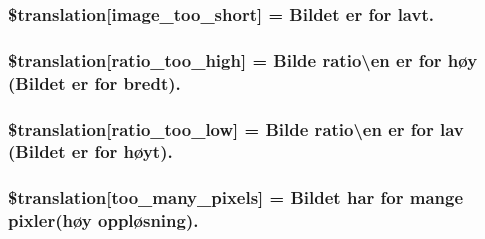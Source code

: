 \subsubsection[{\$translation}]{\setlength{\rightskip}{0pt plus 5cm}\$translation\mbox{[}\textquotesingle{}image\+\_\+too\+\_\+short\textquotesingle{}\mbox{]} = \textquotesingle{}Bildet er for lavt.\textquotesingle{}}\label{class_8upload_8no___n_o_8php_a86fcd4e1157b00032df451188d735527}
\hypertarget{class_8upload_8no___n_o_8php_a23396f6ce7f31e5e5f1b57580621d982}{}
\subsubsection[{\$translation}]{\setlength{\rightskip}{0pt plus 5cm}\$translation\mbox{[}\textquotesingle{}ratio\+\_\+too\+\_\+high\textquotesingle{}\mbox{]} = \textquotesingle{}Bilde ratio\textbackslash{}\textquotesingle{}en er for høy (Bildet er for bredt).\textquotesingle{}}\label{class_8upload_8no___n_o_8php_a23396f6ce7f31e5e5f1b57580621d982}
\hypertarget{class_8upload_8no___n_o_8php_ac533b9a479f056b0b8623e4268f068c2}{}
\subsubsection[{\$translation}]{\setlength{\rightskip}{0pt plus 5cm}\$translation\mbox{[}\textquotesingle{}ratio\+\_\+too\+\_\+low\textquotesingle{}\mbox{]} = \textquotesingle{}Bilde ratio\textbackslash{}\textquotesingle{}en er for lav (Bildet er for høyt).\textquotesingle{}}\label{class_8upload_8no___n_o_8php_ac533b9a479f056b0b8623e4268f068c2}
\hypertarget{class_8upload_8no___n_o_8php_aa4051ef64e94a3f8295c63cf85544016}{}
\subsubsection[{\$translation}]{\setlength{\rightskip}{0pt plus 5cm}\$translation\mbox{[}\textquotesingle{}too\+\_\+many\+\_\+pixels\textquotesingle{}\mbox{]} = \textquotesingle{}Bildet har for mange pixler(høy oppløsning).\textquotesingle{}}\label{class_8upload_8no___n_o_8php_aa4051ef64e94a3f8295c63cf85544016}
\hypertarget{class_8upload_8no___n_o_8php_a1fe342c27ce61f4ff4e0120ba647033e}{}
